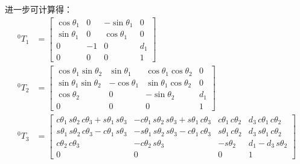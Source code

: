 \documentclass[UTF8, 13pt]{ctexart}
\begin{document}
进一步可计算得：
\[
\begin{aligned}
    {}^0 T_1 &= \begin{bmatrix}
                    \cos\theta_1 & 0 & -\sin\theta_1 & 0 \\
                    \sin\theta_1 & 0 & \cos\theta_1 & 0 \\
                    0 & -1 & 0 & d_1 \\
                    0 & 0 & 0 & 1
                \end{bmatrix} \\
    {}^0 T_2 &= \begin{bmatrix}
                    \cos\theta_1\sin\theta_2 & \sin\theta_1 & \cos\theta_1\cos\theta_2 & 0 \\
                    \sin\theta_1\sin\theta_2 & -\cos\theta_1 & \sin\theta_1\cos\theta_2 & 0 \\
                    \cos\theta_2 & 0 & -\sin\theta_2 & d_1 \\
                    0 & 0 & 0 & 1
                \end{bmatrix} \\
    {}^0 T_3 &= \begin{bmatrix}
                    c\theta_1\, s\theta_2\, c\theta_3 + s\theta_1\, s\theta_3 & -c\theta_1\, s\theta_2\, s\theta_3 + s\theta_1\, c\theta_3 & c\theta_1\, c\theta_2 & d_3\, c\theta_1\, c\theta_2 \\
                    s\theta_1\, s\theta_2\, c\theta_3 - c\theta_1\, s\theta_3 & -s\theta_1\, s\theta_2\, s\theta_3 - c\theta_1\, c\theta_3 & s\theta_1\, c\theta_2 & d_3\, s\theta_1\, c\theta_2 \\
                    c\theta_2\, c\theta_3 & -c\theta_2\, s\theta_3 & -s\theta_2 & d_1 - d_3\, s\theta_2 \\
                    0 & 0 & 0 & 1
                \end{bmatrix}
\end{aligned}
\]
\end{document}
